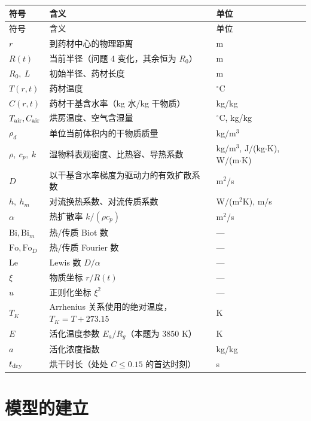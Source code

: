 \documentclass[withoutpreface,bwprint]{cumcmthesis}
\begin{document}
\begin{center}
\small
\begin{longtable}{@{}p{2.5cm}p{8.4cm}p{3.5cm}@{}}
\toprule
符号 & 含义 & 单位 \\
\midrule
\endfirsthead
\toprule
符号 & 含义 & 单位 \\
\midrule
\endhead
$r$ & 到药材中心的物理距离 & m \\
$R(t)$ & 当前半径（问题 4 变化，其余恒为 $R_0$） & m \\
$R_0,\ L$ & 初始半径、药材长度 & m \\
$T(r,t)$ & 药材温度 & $^\circ$C \\
$C(r,t)$ & 药材干基含水率（kg 水/kg 干物质） & kg/kg \\
$T_{\rm air},C_{\rm air}$ & 烘房温度、空气含湿量 & $^\circ$C, kg/kg \\
$\rho_d$ & 单位当前体积内的干物质质量 & kg/m$^3$ \\
$\rho,\ c_p,\ k$ & 湿物料表观密度、比热容、导热系数 & kg/m$^3$, J/(kg$\cdot$K), W/(m$\cdot$K) \\
$D$ & 以干基含水率梯度为驱动力的有效扩散系数 & m$^2$/s \\
$h,\ h_m$ & 对流换热系数、对流传质系数 & W/(m$^2$K), m/s \\
$\alpha$ & 热扩散率 $k/(\rho c_p)$ & m$^2$/s \\
$\mathrm{Bi},\mathrm{Bi}_m$ & 热/传质 Biot 数 & --- \\
$\mathrm{Fo},\mathrm{Fo}_D$ & 热/传质 Fourier 数 & --- \\
$\mathrm{Le}$ & Lewis 数 $D/\alpha$ & --- \\
$\xi$ & 物质坐标 $r/R(t)$ & --- \\
$u$ & 正则化坐标 $\xi^2$ & --- \\
$T_K$ & Arrhenius 关系使用的绝对温度，$T_K=T+273.15$ & K \\
$E$ & 活化温度参数 $E_a/R_g$（本题为 $3850$ K） & K \\
$a$ & 活化浓度指数 & kg/kg \\
$t_{\rm dry}$ & 烘干时长（处处 $C\le0.15$ 的首达时刻） & s \\
\bottomrule
\end{longtable}
\end{center}
\setcounter{table}{0}   %

\section{模型的建立}
\end{document}
